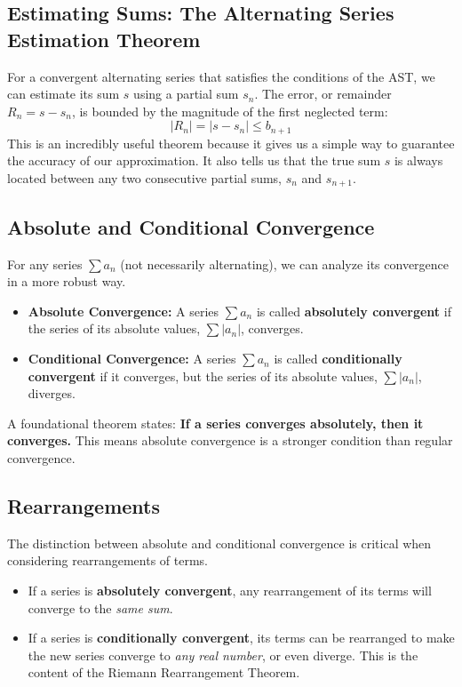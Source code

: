 \documentclass{article}
\begin{document}
\subsection{Estimating Sums: The Alternating Series Estimation Theorem}
For a convergent alternating series that satisfies the conditions of the AST, we can estimate its sum $s$ using a partial sum $s_n$. The error, or remainder $R_n = s - s_n$, is bounded by the magnitude of the first neglected term:
\[ |R_n| = |s - s_n| \le b_{n+1} \]
This is an incredibly useful theorem because it gives us a simple way to guarantee the accuracy of our approximation. It also tells us that the true sum $s$ is always located between any two consecutive partial sums, $s_n$ and $s_{n+1}$.

\subsection{Absolute and Conditional Convergence}
For any series $\sum a_n$ (not necessarily alternating), we can analyze its convergence in a more robust way.
\begin{itemize}
    \item \textbf{Absolute Convergence:} A series $\sum a_n$ is called \textbf{absolutely convergent} if the series of its absolute values, $\sum |a_n|$, converges.
    \item \textbf{Conditional Convergence:} A series $\sum a_n$ is called \textbf{conditionally convergent} if it converges, but the series of its absolute values, $\sum |a_n|$, diverges.
\end{itemize}
A foundational theorem states: \textbf{If a series converges absolutely, then it converges.}
This means absolute convergence is a stronger condition than regular convergence.

\subsection{Rearrangements}
The distinction between absolute and conditional convergence is critical when considering rearrangements of terms.
\begin{itemize}
    \item If a series is \textbf{absolutely convergent}, any rearrangement of its terms will converge to the \textit{same sum}.
    \item If a series is \textbf{conditionally convergent}, its terms can be rearranged to make the new series converge to \textit{any real number}, or even diverge. This is the content of the Riemann Rearrangement Theorem.
\end{itemize}
\end{document}

